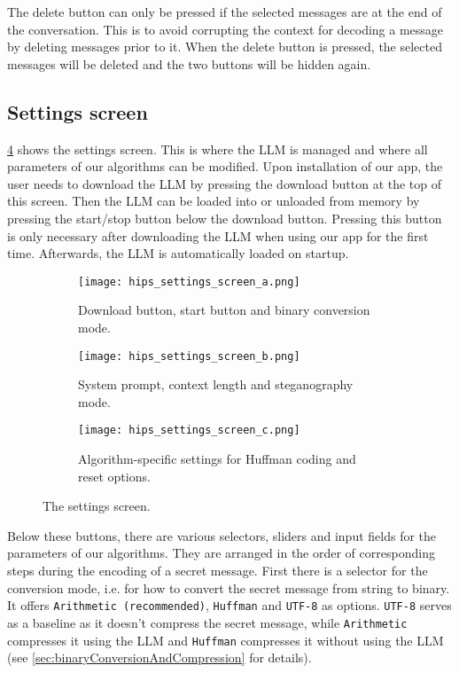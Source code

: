The delete button can only be pressed if the selected messages are at the end of the conversation. This is to avoid corrupting the context for decoding a message by deleting messages prior to it. When the delete button is pressed, the selected messages will be deleted and the two buttons will be hidden again.

\subsection{Settings screen}
\label{sec:settingsScreen}
\cref{fig:settingsScreen} shows the settings screen. This is where the \gls{LLM} is managed and where all parameters of our algorithms can be modified. Upon installation of our app, the user needs to download the \gls{LLM} by pressing the download button at the top of this screen. Then the \gls{LLM} can be loaded into or unloaded from memory by pressing the start/stop button below the download button. Pressing this button is only necessary after downloading the \gls{LLM} when using our app for the first time. Afterwards, the \gls{LLM} is automatically loaded on startup.

\begin{figure}
	\begin{wide}
		\captionsetup{width=\linewidth}
		\begin{subfigure}{0.3\linewidth}
			\centering
			\texttt{[image: hips\_settings\_screen\_a.png]}
			\caption{Download button, start button and binary conversion mode.}
			\label{fig:settingsScreenA}
		\end{subfigure}
        \hfill
        \begin{subfigure}{0.3\linewidth}
			\centering
			\texttt{[image: hips\_settings\_screen\_b.png]}
			\caption{System prompt, context length and steganography mode.}
			\label{fig:settingsScreenB}
		\end{subfigure}
        \hfill
        \begin{subfigure}{0.3\linewidth}
			\centering
			\texttt{[image: hips\_settings\_screen\_c.png]}
			\caption{Algorithm-specific settings for Huffman coding and reset options.}
			\label{fig:settingsScreenC}
		\end{subfigure}
		\caption[HiPS: Settings screen]{The settings screen.}
		\label{fig:settingsScreen}
	\end{wide}
\end{figure}

Below these buttons, there are various selectors, sliders and input fields for the parameters of our algorithms. They are arranged in the order of corresponding steps during the encoding of a secret message. First there is a selector for the conversion mode, i.e. for how to convert the secret message from string to binary. It offers \lstinline|Arithmetic (recommended)|, \lstinline|Huffman| and \lstinline|UTF-8| as options. \lstinline|UTF-8| serves as a baseline as it doesn't compress the secret message, while \lstinline|Arithmetic| compresses it using the \gls{LLM} and \lstinline|Huffman| compresses it without using the \gls{LLM} (see \cref{sec:binaryConversionAndCompression} for details).

